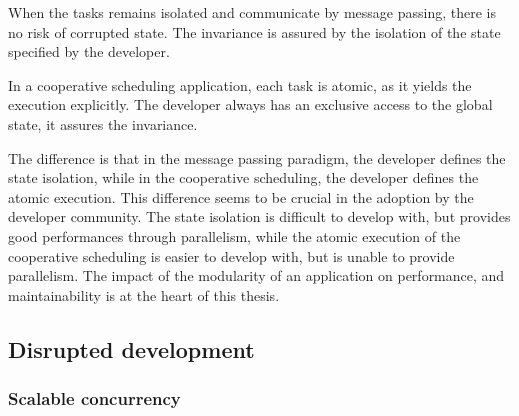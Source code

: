 When the tasks remains isolated and communicate by message passing, there is no risk of corrupted state.
The invariance is assured by the isolation of the state specified by the developer.

In a cooperative scheduling application, each task is atomic, as it yields the execution explicitly.
The developer always has an exclusive access to the global state, it assures the invariance.


The difference is that in the message passing paradigm, the developer defines the state isolation, while in the cooperative scheduling, the developer defines the atomic execution.
This difference seems to be crucial in the adoption by the developer community.
The state isolation is difficult to develop with, but provides good performances through parallelism, while the atomic execution of the cooperative scheduling is easier to develop with, but is unable to provide parallelism.
The impact of the modularity of an application on performance, and maintainability is at the heart of this thesis.

\subsection{Disrupted development}


\subsubsection{Scalable concurrency}

